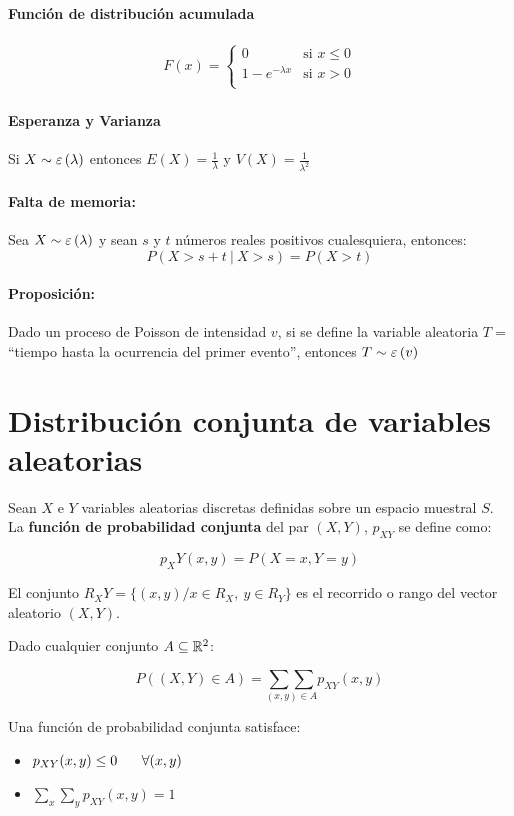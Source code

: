 \paragraph{Función de distribución acumulada}
\begin{align*}
F(x) =\left\{
\begin{array}{ll}
0  & \text{si } x \leq 0\\
1 - e^{-\lambda x} & \text{si } x > 0\\
\end{array}
\right.
\end{align*}

\paragraph{Esperanza y Varianza} Si $X\sim \varepsilon\left(\lambda\right)$ entonces $E(X) = \frac{1}{\lambda}$ y $V(X) = \frac{1}{\lambda^2}$

\paragraph{Falta de memoria:} Sea $X\sim \varepsilon\left(\lambda\right)$ y sean $s$ y $t$ números reales positivos cualesquiera, entonces:
$$P(X>s+t~|~X>s) = P(X> t)$$

\paragraph{Proposición:} Dado un proceso de Poisson de intensidad $v$, si se define la variable aleatoria $T =$ ``tiempo hasta la ocurrencia del primer evento'', entonces $T\sim \varepsilon\left(v\right)$
\section{Distribución conjunta de variables aleatorias}
Sean $X$ e $Y$ variables aleatorias discretas definidas sobre un espacio muestral $S$. La \textbf{función de probabilidad conjunta} del par $(X,Y)$, $p_{XY}$ se define como:

$$p_XY(x,y) = P(X = x, Y = y)$$

El conjunto  $R_XY =  \{(x,y) / x \in R_X,~y\in R_Y\}$ es el recorrido o rango del vector aleatorio $(X,Y)$.

Dado cualquier conjunto $A\subseteq \mathbb{R}^2$:

$$P((X,Y)\in A) = \underset{(x,y)\in A}{\sum\sum} p_{XY}(x,y)$$

Una función de probabilidad conjunta satisface:

\begin{itemize}
	\item $p_{XY}(x,y) \leq 0~\hspace*{5mm} \forall(x,y)$
	\item $\sum\limits_x\sum\limits_y p_{XY}(x,y) = 1$
\end{itemize}

